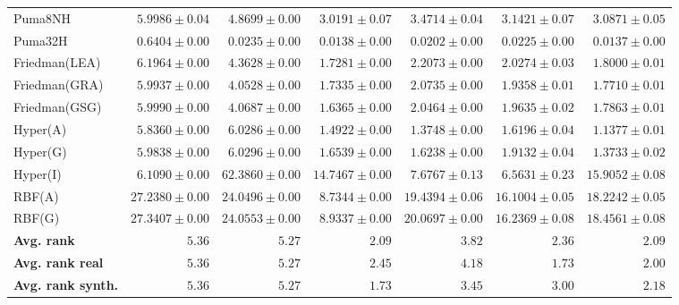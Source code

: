 \begin{table*}[!htbp]
{\begin{tabular}{lrrrrrr}
		Puma8NH & $5.9986 \pm 0.04$ & $4.8699 \pm 0.00$ & $\mathbf{3.0191 \pm 0.07}$ & $3.4714 \pm 0.04$ & $3.1421 \pm 0.07$ & $3.0871 \pm 0.05$\\
		Puma32H & $0.6404 \pm 0.00$ & $0.0235 \pm 0.00$ & $0.0138 \pm 0.00$ & $0.0202 \pm 0.00$ & $0.0225 \pm 0.00$ & $\mathbf{0.0137 \pm 0.00}$\\
		Friedman(LEA) & $6.1964 \pm 0.00$ & $4.3628 \pm 0.00$ & $\mathbf{1.7281 \pm 0.00}$ & $2.2073 \pm 0.00$ & $2.0274 \pm 0.03$ & $1.8000 \pm 0.01$\\
		Friedman(GRA) & $5.9937 \pm 0.00$ & $4.0528 \pm 0.00$ & $\mathbf{1.7335 \pm 0.00}$ & $2.0735 \pm 0.00$ & $1.9358 \pm 0.01$ & $1.7710 \pm 0.01$\\
		Friedman(GSG) & $5.9990 \pm 0.00$ & $4.0687 \pm 0.00$ & $\mathbf{1.6365 \pm 0.00}$ & $2.0464 \pm 0.00$ & $1.9635 \pm 0.02$ & $1.7863 \pm 0.01$\\
		Hyper(A) & $5.8360 \pm 0.00$ & $6.0286 \pm 0.00$ & $1.4922 \pm 0.00$ & $1.3748 \pm 0.00$ & $1.6196 \pm 0.04$ & $\mathbf{1.1377 \pm 0.01}$\\
		Hyper(G) & $5.9838 \pm 0.00$ & $6.0296 \pm 0.00$ & $1.6539 \pm 0.00$ & $1.6238 \pm 0.00$ & $1.9132 \pm 0.04$ & $\mathbf{1.3733 \pm 0.02}$\\
		Hyper(I) & $\mathbf{6.1090 \pm 0.00}$ & $62.3860 \pm 0.00$ & $14.7467 \pm 0.00$ & $7.6767 \pm 0.13$ & $6.5631 \pm 0.23$ & $15.9052 \pm 0.08$\\
		RBF(A) & $27.2380 \pm 0.00$ & $24.0496 \pm 0.00$ & $\mathbf{8.7344 \pm 0.00}$ & $19.4394 \pm 0.06$ & $16.1004 \pm 0.05$ & $18.2242 \pm 0.05$\\
		RBF(G) & $27.3407 \pm 0.00$ & $24.0553 \pm 0.00$ & $\mathbf{8.9337 \pm 0.00}$ & $20.0697 \pm 0.00$ & $16.2369 \pm 0.08$ & $18.4561 \pm 0.08$\\
		\midrule
		\textbf{{Avg. rank}} & $5.36$ & $5.27$ & $\mathbf{2.09}$ & $3.82$ & $2.36$ & $\mathbf{2.09}$\\
		\textbf{{Avg. rank real}} & $5.36$ & $5.27$ & $2.45$ & $4.18$ & $\mathbf{1.73}$ & $2.00$\\
		\textbf{{Avg. rank synth.}} & $5.36$ & $5.27$ & $\mathbf{1.73}$ & $3.45$ & $3.00$ & $2.18$\\
		\bottomrule
	\end{tabular}}
\end{table*}
